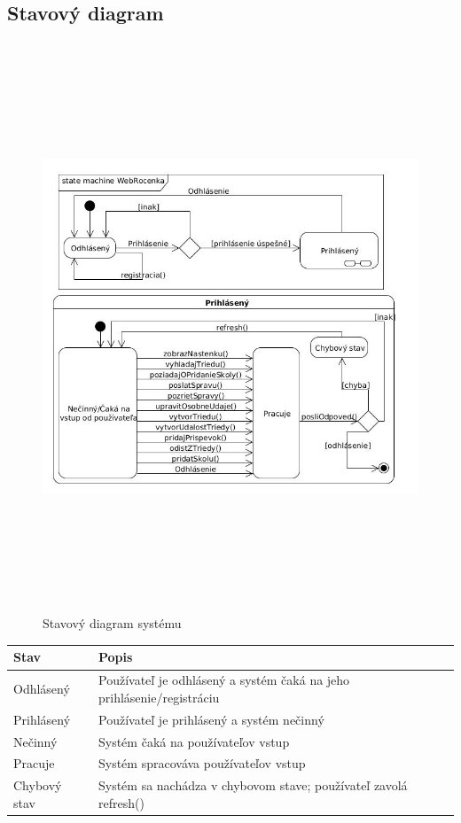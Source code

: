 \documentclass[slovak, 12pt, Times New Roman]{article}
\begin{document}
		\subsection{Stavový diagram}
			\begin{figure}[!htb]
				\centering
				\includegraphics[width = 16cm, height = 17cm]{StateMachine.jpg}
				\caption{Stavový diagram systému}
				\label{fig:Reinforcement}
			\end{figure}
			\begin{tabular} {|p{4cm}|p{11cm}|}
				\hline
				\textbf{Stav} & \textbf{Popis} \\
				\hline
				Odhlásený & Používateľ je odhlásený a systém čaká na jeho prihlásenie/registráciu\\
				\hline
				Prihlásený & Používateľ je prihlásený a systém nečinný\\
				\hline
				Nečinný & Systém čaká na používateľov vstup\\
				\hline
				Pracuje & Systém spracováva používateľov vstup\\
				\hline
				Chybový stav & Systém sa nachádza v chybovom stave; používateľ zavolá refresh()\\
				\hline
			\end{tabular}
\end{document}

